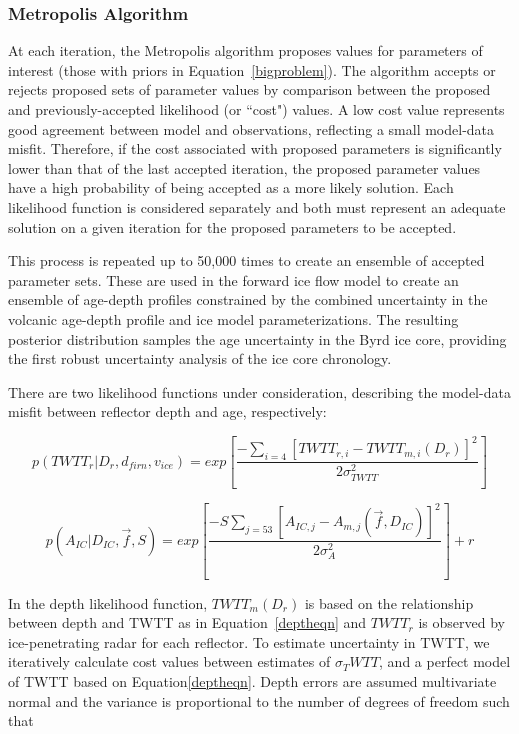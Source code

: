 \subsubsection{Metropolis Algorithm}\label{metrop}
At each iteration, the Metropolis algorithm proposes values for parameters of interest (those with priors in Equation~\ref{bigproblem}). The algorithm accepts or rejects proposed sets of parameter values by comparison between the proposed and previously-accepted likelihood (or ``cost") values. A low cost value represents good agreement between model and observations, reflecting a small model-data misfit. Therefore, if the cost associated with proposed parameters is significantly lower than that of the last accepted iteration, the proposed parameter values have a high probability of being accepted as a more likely solution. Each likelihood function is considered separately and both must represent an adequate solution on a given iteration for the proposed parameters to be accepted.

This process is repeated up to 50,000 times to create an ensemble of accepted parameter sets. These are used in the forward ice flow model to create an ensemble of age-depth profiles constrained by the combined uncertainty in the volcanic age-depth profile and ice model parameterizations. The resulting posterior distribution samples the age uncertainty in the Byrd ice core, providing the first robust uncertainty analysis of the ice core chronology. 

There are two likelihood functions under consideration, describing the model-data misfit between reflector depth and age, respectively:

\begin{equation}\label{eqn:loglikedepth}
p(TWTT_r | D_r,d_{firn},v_{ice} )= exp[\frac{-\sum_{i=4}[TWTT_{r,i} - TWTT_{m,i}(D_r)]^2}{2\sigma_{TWTT}^2}]
\end{equation}

\begin{equation}\label{loglikeage}
p(A_{IC} | D_{IC},\vec{f},S)= exp[\frac{-S\sum_{j = 53}[A_{IC,j} - A_{m,j}(\vec{f},D_{IC})]^2}{2\sigma_A^2}] + r
\end{equation}

In the depth likelihood function, $TWTT_m(D_r)$ is based on the relationship between depth and TWTT as in Equation~\ref{deptheqn} and $TWTT_r$ is observed by ice-penetrating radar for each reflector. To estimate uncertainty in TWTT, we iteratively calculate cost values between estimates of $\sigma_TWTT$, and a perfect model of TWTT based on Equation\ref{deptheqn}. Depth errors are assumed multivariate normal and the variance is proportional to the number of degrees of freedom such that

